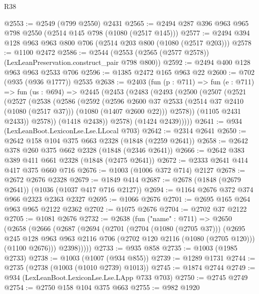 \begin{lexlean}{R38}
\begin{coremodule}
@2553 := @2549 (@799 @2550) @2431
@2565 := @2494 @287 @396 @963 @965 @798 @2550 (@2514 @145 @798 (@1080 (@2517 @145)))
@2577 := @2494 @394 @128 @963 @963 @800 @706 (@2514 @203 @800 (@1080 (@2517 @203)))
@2578 := @1100 @2472
@2586 := @2544 (@2553 (@2565 (@2577 @2578)) (LexLeanPreservation.construct_pair @798 @800))
@2592 := @2494 @400 @128 @963 @963 @2533 @706
@2596 := @1385 @2472 @165 @963 @22
@2600 := @702 (@935 (@936 @1777)) @2535
@2638 := @2403
    (fun (p : @711) =>
    fun (e : @711) =>
    fun (us : @694) =>
    @2445
      (@2453
        (@2483
          (@2493
            (@2500
              (@2507
                (@2521
                  (@2527
                    (@2538
                      (@2586
                        (@2592
                          (@2596
                            @2600
                            @37
                            @2533
                            (@2514 @37 @2410 (@1080 (@2517 @37)))
                            (@1080 (@1407 @2600 @22)))
                          @2578))
                      (@1105 @2431 @2433))
                    @2578))
                (@1418 @2438))
              @2578)
            (@1424 @2439)))))
@2641 := @934 (LexLeanBoot.LexiconLse.Lse.LLocal @703)
@2642 := @2314 @2641
@2650 := @2642 @158 @104 @375 @663 @2328 (@1848 (@2259 @2641))
@2658 := @2642 @378 @260 @375 @662 @2328 (@1848 (@2346 @2641))
@2666 := @2642 @383 @389 @411 @661 @2328 (@1848 (@2475 @2641))
@2672 := @2333 @2641 @414 @417 @375 @660 @716
@2676 := @1003 (@1006 @372 @714) @2127
@2678 := @2672 @2676 @2328
@2679 := @1849 @414
@2687 := @2678 (@1848 (@2679 @2641)) (@1036 (@1037 @417 @716 @2127))
@2694 := @1164 @2676 @372 @374 @966 @2323 @2363 @2327
@2695 := @1066 @2676
@2701 := @2695 @165 @264 @963 @965 @2122 @2362
@2702 := @1075 @2676
@2704 := @2702 @37 @2122
@2705 := @1081 @2676
@2732 := @2638
    (fun ("name" : @711) =>
    @2650
      (@2658
        (@2666
          (@2687
            (@2694
              (@2701
                (@2704 (@1080 (@2705 @37)))
                (@2695
                  @245
                  @128
                  @963
                  @963
                  @2116
                  @706
                  (@2702 @120 @2116 (@1080 (@2705 @120)))
                  (@1100 @2676)))
              @2398)))))
@2733 := @935 @858
@2735 := @1003 (@1985 @2733)
@2738 := @1003 (@1007 (@934 @855))
@2739 := @1289 @1731
@2744 := @2735 (@2738 (@1003 (@1010 @2739) @1013))
@2745 := @1874 @2744
@2749 := @934 (LexLeanBoot.LexiconLse.Lse.LApp @733 @703)
@2750 := @2745 @2749
@2754 := @2750 @158 @104 @375 @663
@2755 := @982 @1920

\end{coremodule}
\end{lexlean}
